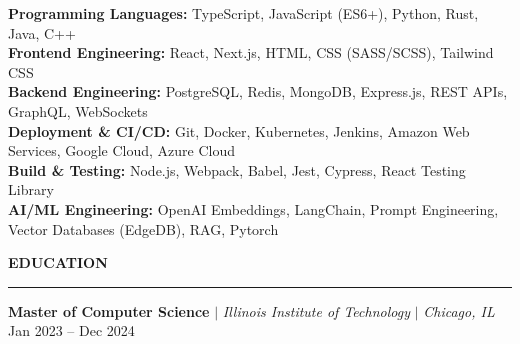 \documentclass[10pt,letterpaper]{article}
\begin{document}
\hspace{0in}\textbf{Programming Languages:} TypeScript, JavaScript (ES6+), Python, Rust, Java, C++\\
\hspace{0.25in}\textbf{Frontend Engineering:} React, Next.js, HTML, CSS (SASS/SCSS), Tailwind CSS\\
\hspace{0.25in}\textbf{Backend Engineering:} PostgreSQL, Redis, MongoDB, Express.js, REST APIs, GraphQL, WebSockets \\
\hspace{0.25in}\textbf{Deployment \& CI/CD:} Git, Docker, Kubernetes, Jenkins,  Amazon Web Services, Google Cloud, Azure Cloud\\
\hspace{0.25in}\textbf{Build \& Testing:} Node.js, Webpack, Babel, Jest, Cypress, React Testing Library\\
\hspace{0.25in}\textbf{AI/ML Engineering:} OpenAI Embeddings, LangChain, Prompt Engineering, Vector Databases (EdgeDB), RAG, Pytorch

\vspace{2mm}
{\hspace{0in}\small\textbf{EDUCATION}}\par
\vspace{-2mm}
\noindent\rule{\textwidth}{0.1pt}
\vspace{-4mm}

\hspace{0in}\textbf{Master of Computer Science} $|$ \textit{Illinois Institute of Technology} $|$ \textit{Chicago, IL} \hfill Jan 2023 -- Dec 2024  
\begin{itemize}[leftmargin=0.15in,nosep,topsep=3pt]
\end{itemize}
\end{document}

